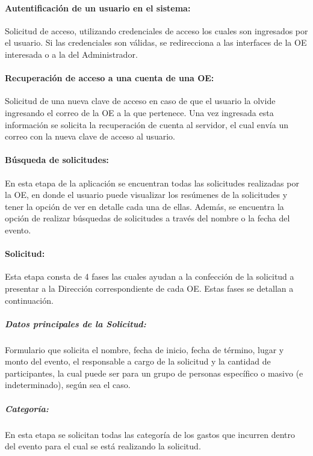 
\paragraph{Autentificación de un usuario en el sistema: } Solicitud de acceso, utilizando credenciales de acceso los cuales son ingresados por el usuario. Si las credenciales son válidas, se redirecciona a las interfaces de la OE interesada o a la del Administrador.

\paragraph{Recuperación de acceso a una cuenta de una OE: } Solicitud de una nueva clave de acceso en caso de que el usuario la olvide ingresando el correo de la OE a la que pertenece. Una vez ingresada esta información se solicita la recuperación de cuenta al servidor, el cual envía un correo con la nueva clave de acceso al usuario.

\paragraph{Búsqueda de solicitudes: } En esta etapa de la aplicación se encuentran todas las solicitudes realizadas por la OE, en donde el usuario puede visualizar los resúmenes de la solicitudes y tener la opción de ver en detalle cada una de ellas. Además, se encuentra la opción de realizar búsquedas de solicitudes a través del nombre o la fecha del evento.

\paragraph{Solicitud: }Esta etapa consta de 4 fases las cuales ayudan a la confección de la solicitud a presentar a la Dirección correspondiente de cada OE. Estas fases se detallan a continuación. 

    \subparagraph{\emph{Datos principales de la Solicitud: }} Formulario que solicita el nombre, fecha de inicio, fecha de término, lugar y monto del evento, el responsable a cargo de la solicitud y la cantidad de participantes, la cual puede ser para un grupo de personas específico o masivo (e indeterminado), según sea el caso.

    \subparagraph{\emph{Categoría: }} En esta etapa se solicitan todas las categoría de los gastos que incurren dentro del evento para el cual se está realizando la solicitud.

